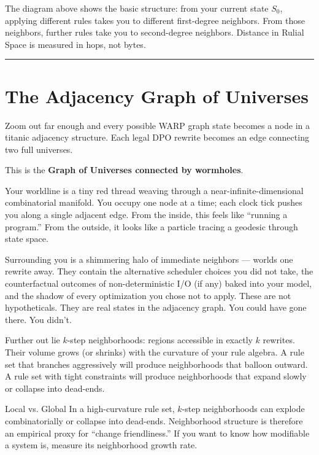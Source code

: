 The diagram above shows the basic structure: from your current state $S_0$, applying different rules takes you to different first-degree neighbors. From those neighbors, further rules take you to second-degree neighbors. Distance in Rulial Space is measured in hops, not bytes.

\begin{center}\rule{0.5\linewidth}{0.5pt}\end{center}

\section{The Adjacency Graph of Universes}
\label{7.2-adjacency-graph}

Zoom out far enough and every possible WARP graph state becomes a node in a titanic adjacency structure. Each legal DPO rewrite becomes an edge connecting two full universes.

This is the \textbf{Graph of Universes connected by wormholes}.

Your worldline is a tiny red thread weaving through a near-infinite-dimensional combinatorial manifold. You occupy one node at a time; each clock tick pushes you along a single adjacent edge. From the inside, this feels like ``running a program.'' From the outside, it looks like a particle tracing a geodesic through state space.

Surrounding you is a shimmering halo of immediate neighbors --- worlds one rewrite away. They contain the alternative scheduler choices you did not take, the counterfactual outcomes of non-deterministic I/O (if any) baked into your model, and the shadow of every optimization you chose not to apply. These are not hypotheticals. They are real states in the adjacency graph. You could have gone there. You didn't.

Further out lie $k$-step neighborhoods: regions accessible in exactly $k$ rewrites. Their volume grows (or shrinks) with the curvature of your rule algebra. A rule set that branches aggressively will produce neighborhoods that balloon outward. A rule set with tight constraints will produce neighborhoods that expand slowly or collapse into dead-ends.

\begin{callout}{Local vs. Global}
In a high-curvature rule set, $k$-step neighborhoods can explode combinatorially or collapse into dead-ends. Neighborhood structure is therefore an empirical proxy for ``change friendliness.'' If you want to know how modifiable a system is, measure its neighborhood growth rate.
\end{callout}

